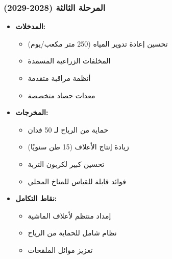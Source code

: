\subsubsection{المرحلة الثالثة (2028-2029)}
\begin{itemize}
    \item \textbf{المدخلات:}
    \begin{itemize}
        \item تحسين إعادة تدوير المياه (250 متر مكعب/يوم)
        \item المخلفات الزراعية المسمدة
        \item أنظمة مراقبة متقدمة
        \item معدات حصاد متخصصة
    \end{itemize}
    \item \textbf{المخرجات:}
    \begin{itemize}
        \item حماية من الرياح لـ 50 فدان
        \item زيادة إنتاج الأعلاف (15 طن سنويًا)
        \item تحسين كبير لكربون التربة
        \item فوائد قابلة للقياس للمناخ المحلي
    \end{itemize}
    \item \textbf{نقاط التكامل:}
    \begin{itemize}
        \item إمداد منتظم لأعلاف الماشية
        \item نظام شامل للحماية من الرياح
        \item تعزيز موائل الملقحات
    \end{itemize}
\end{itemize}


